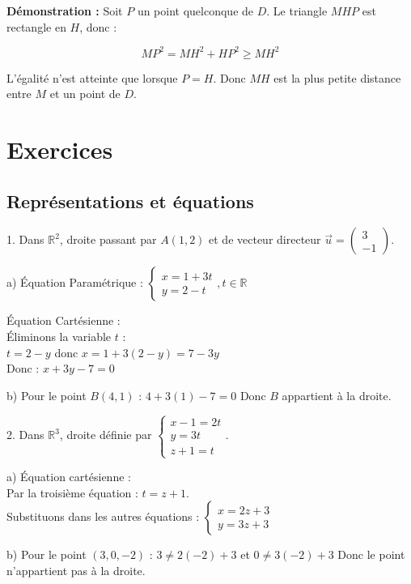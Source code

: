 \documentclass[10pt,a4paper]{article}
\begin{document}
\textbf{Démonstration :}
Soit $P$ un point quelconque de $D$. Le triangle $MHP$ est rectangle en $H$, donc :

\[ MP^2 = MH^2 + HP^2 \geq MH^2 \]

L'égalité n'est atteinte que lorsque $P = H$. Donc $MH$ est la plus petite distance entre $M$ et un point de $D$.



\section*{Exercices}

\subsection*{Représentations et équations}

1. Dans $\mathbb{R}^2$, droite passant par $A(1, 2)$ et de vecteur directeur $\vec{u} = \begin{pmatrix} 3 \\ -1 \end{pmatrix}$.

   a) Équation Paramétrique :
   $\begin{cases} x = 1 + 3t \\ y = 2 - t \end{cases}, t \in \mathbb{R}$

   Équation Cartésienne :\\
   Éliminons la variable $t$ :\\
   $t = 2 - y$ donc $x = 1 + 3(2 - y) = 7 - 3y$\\
   Donc : $x + 3y - 7 = 0$

   b) Pour le point $B(4, 1)$ :
   $4 + 3(1) - 7 = 0$
   Donc $B$ appartient à la droite.

2. Dans $\mathbb{R}^3$, droite définie par $\begin{cases} x - 1 = 2t \\ y = 3t \\ z + 1 = t \end{cases}$.

   a) Équation cartésienne :\\
   Par la troisième équation : $t = z + 1$.\\
   Substituons dans les autres équations :
   $\begin{cases} x = 2z + 3 \\ y = 3z + 3 \end{cases}$

   b) Pour le point $(3, 0, -2)$ :
   $3 \neq 2(-2) + 3$ et $0 \neq 3(-2) + 3$
   Donc le point n'appartient pas à la droite.
\end{document}
